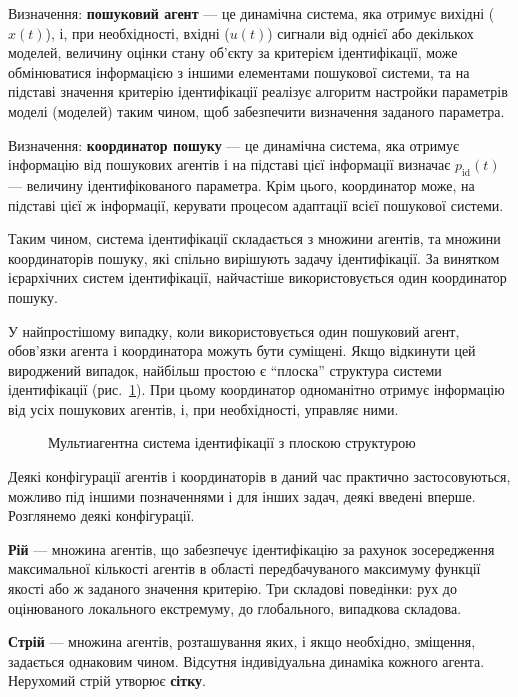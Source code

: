 \documentclass[a4paper,13pt]{atuaref}
\begin{document}
Визначення:
\textbf{пошуковий агент} --- це динамічна система, яка отримує вихідні ($x(t)$),
і, при необхідності, вхідні ($u(t)$) сигнали від однієї або декількох моделей,
величину оцінки стану об'єкту за критерієм ідентифікації,
може обмінюватися інформацією з іншими елементами пошукової системи,
та на підставі значення критерію
ідентифікації реалізує алгоритм настройки параметрів моделі (моделей) таким
чином, щоб забезпечити визначення заданого параметра.

Визначення:
\textbf{координатор пошуку} --- це динамічна система, яка отримує інформацію
від пошукових агентів і на підставі цієї інформації визначає
$p_{\mathrm{id}}(t)$ --- величину ідентифікованого параметра.
Крім цього, координатор може, на підставі цієї ж інформації,
керувати процесом адаптації всієї пошукової системи.

Таким чином, система ідентифікації складається з множини агентів, та
множини координаторів пошуку, які спільно вирішують задачу ідентифікації.
За винятком ієрархічних систем ідентифікації, найчастіше використовується один координатор пошуку.

У найпростішому випадку, коли використовується один пошуковий агент, обов'язки
агента і координатора можуть бути суміщені. Якщо відкинути цей вироджений
випадок, найбільш простою є ``плоска'' структура системи ідентифікації (рис.~\ref{atu:f:agents_flat}).
При цьому координатор одноманітно отримує
інформацію від усіх пошукових агентів, і, при необхідності, управляє ними.

\begin{figure}[htb!]
\begin{center}

\end{center}
\caption{Мультиагентна система ідентифікації з плоскою структурою}
\label{atu:f:agents_flat}
\end{figure}

Деякі конфігурації агентів і координаторів в даний час практично
застосовуються, можливо під іншими позначеннями і для інших задач, деякі
введені вперше. Розглянемо деякі конфігурації.

\textbf{Рій} --- множина агентів, що забезпечує ідентифікацію за рахунок
зосередження максимальної кількості агентів в області передбачуваного максимуму
функції якості або ж заданого значення критерію. Три складові поведінки: рух
до оцінюваного локального екстремуму, до глобального, випадкова складова.

\textbf{Стрій} --- множина агентів, розташування яких, і якщо необхідно,
зміщення, задається однаковим чином. Відсутня індивідуальна динаміка кожного
агента. Нерухомий стрій утворює \textbf{сітку}.
\end{document}
